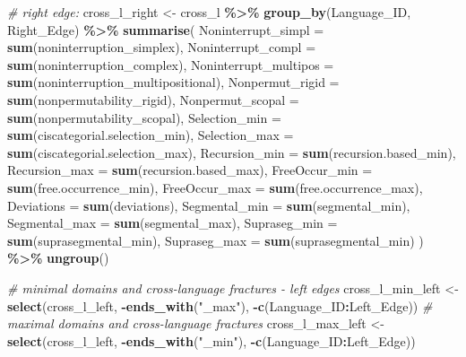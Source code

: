\documentclass[
]{article}
\newenvironment{Shaded}{\begin{snugshade}}{\end{snugshade}}
\newcommand{\AttributeTok}[1]{\textcolor[rgb]{0.13,0.29,0.53}{#1}}
\newcommand{\CommentTok}[1]{\textcolor[rgb]{0.56,0.35,0.01}{\textit{#1}}}
\newcommand{\FunctionTok}[1]{\textcolor[rgb]{0.13,0.29,0.53}{\textbf{#1}}}
\newcommand{\NormalTok}[1]{#1}
\newcommand{\OtherTok}[1]{\textcolor[rgb]{0.56,0.35,0.01}{#1}}
\newcommand{\SpecialCharTok}[1]{\textcolor[rgb]{0.81,0.36,0.00}{\textbf{#1}}}
\newcommand{\StringTok}[1]{\textcolor[rgb]{0.31,0.60,0.02}{#1}}
\begin{document}
\begin{Shaded}
\begin{Highlighting}[]
\CommentTok{\# right edge:}
\NormalTok{cross\_l\_right }\OtherTok{\textless{}{-}}\NormalTok{ cross\_l }\SpecialCharTok{\%\textgreater{}\%}
  \FunctionTok{group\_by}\NormalTok{(Language\_ID, Right\_Edge) }\SpecialCharTok{\%\textgreater{}\%}
  \FunctionTok{summarise}\NormalTok{(}
    \AttributeTok{Noninterrupt\_simpl =} \FunctionTok{sum}\NormalTok{(noninterruption\_simplex),}
    \AttributeTok{Noninterrupt\_compl =} \FunctionTok{sum}\NormalTok{(noninterruption\_complex),}
    \AttributeTok{Noninterrupt\_multipos =} \FunctionTok{sum}\NormalTok{(noninterruption\_multipositional),}
    \AttributeTok{Nonpermut\_rigid =} \FunctionTok{sum}\NormalTok{(nonpermutability\_rigid),}
    \AttributeTok{Nonpermut\_scopal =} \FunctionTok{sum}\NormalTok{(nonpermutability\_scopal),}
    \AttributeTok{Selection\_min =} \FunctionTok{sum}\NormalTok{(ciscategorial.selection\_min),}
    \AttributeTok{Selection\_max =} \FunctionTok{sum}\NormalTok{(ciscategorial.selection\_max),}
    \AttributeTok{Recursion\_min =} \FunctionTok{sum}\NormalTok{(recursion.based\_min),}
    \AttributeTok{Recursion\_max =} \FunctionTok{sum}\NormalTok{(recursion.based\_max),}
    \AttributeTok{FreeOccur\_min =} \FunctionTok{sum}\NormalTok{(free.occurrence\_min),}
    \AttributeTok{FreeOccur\_max =} \FunctionTok{sum}\NormalTok{(free.occurrence\_max),}
    \AttributeTok{Deviations =} \FunctionTok{sum}\NormalTok{(deviations),}
    \AttributeTok{Segmental\_min =} \FunctionTok{sum}\NormalTok{(segmental\_min),}
    \AttributeTok{Segmental\_max =} \FunctionTok{sum}\NormalTok{(segmental\_max),}
    \AttributeTok{Supraseg\_min =} \FunctionTok{sum}\NormalTok{(suprasegmental\_min),}
    \AttributeTok{Supraseg\_max =} \FunctionTok{sum}\NormalTok{(suprasegmental\_min)}
\NormalTok{  ) }\SpecialCharTok{\%\textgreater{}\%}
  \FunctionTok{ungroup}\NormalTok{()}

\CommentTok{\# minimal domains and cross{-}language fractures {-} left edges}
\NormalTok{cross\_l\_min\_left }\OtherTok{\textless{}{-}} \FunctionTok{select}\NormalTok{(cross\_l\_left, }\SpecialCharTok{{-}}\FunctionTok{ends\_with}\NormalTok{(}\StringTok{"\_max"}\NormalTok{), }\SpecialCharTok{{-}}\FunctionTok{c}\NormalTok{(Language\_ID}\SpecialCharTok{:}\NormalTok{Left\_Edge))}
\CommentTok{\# maximal domains and cross{-}language fractures}
\NormalTok{cross\_l\_max\_left }\OtherTok{\textless{}{-}} \FunctionTok{select}\NormalTok{(cross\_l\_left, }\SpecialCharTok{{-}}\FunctionTok{ends\_with}\NormalTok{(}\StringTok{"\_min"}\NormalTok{), }\SpecialCharTok{{-}}\FunctionTok{c}\NormalTok{(Language\_ID}\SpecialCharTok{:}\NormalTok{Left\_Edge))}


\end{Highlighting}
\end{Shaded}
\end{document}
